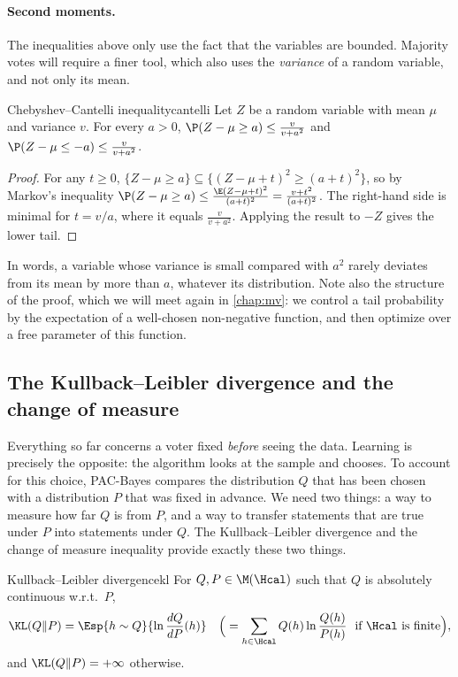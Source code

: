 \paragraph{Second moments.} The inequalities above only use the fact that the
variables are bounded. Majority votes will require a finer tool, which also
uses the \emph{variance} of a random variable, and not only its mean.

\begin{lemma}{Chebyshev--Cantelli inequality}{cantelli}
Let $Z$ be a random variable with mean $\mu$ and variance $v$. For every $a>0$,
$\P(Z-\mu\geq a)\leq\frac{v}{v+a^2}$ and $\P(Z-\mu\leq-a)\leq\frac{v}{v+a^2}$.
\end{lemma}
\begin{proof}
For any $t\geq0$, $\{Z-\mu\geq a\}\subseteq\{(Z-\mu+t)^2\geq(a+t)^2\}$, so by Markov's
inequality $\P(Z-\mu\geq a)\leq\frac{\E(Z-\mu+t)^2}{(a+t)^2}=\frac{v+t^2}{(a+t)^2}$. The
right-hand side is minimal for $t=v/a$, where it equals $\frac{v}{v+a^2}$. Applying
the result to $-Z$ gives the lower tail.
\end{proof}

In words, a variable whose variance is small compared with $a^2$ rarely
deviates from its mean by more than $a$, whatever its distribution. Note also
the structure of the proof, which we will meet again in \cref{chap:mv}: we control a tail probability by the expectation of a well-chosen non-negative
function, and then optimize over a free parameter of this function.

\subsection{The Kullback--Leibler divergence and the change of measure}

Everything so far concerns a voter fixed \emph{before} seeing the data. Learning
is precisely the opposite: the algorithm looks at the sample and chooses. To
account for this choice, PAC-Bayes compares the distribution $Q$ that has been
chosen with a distribution $P$ that was fixed in advance. We need two things: a
way to measure how far $Q$ is from $P$, and a way to transfer statements that are
true under $P$ into statements under $Q$. The Kullback--Leibler divergence and
the change of measure inequality provide exactly these two things.

\begin{definition}{Kullback--Leibler divergence}{kl}
For $Q,P\in\M(\Hcal)$ such that $Q$ is absolutely continuous w.r.t.\ $P$,
\[
  \KL(Q\|P)=\Esp{h\sim Q}{\ln\frac{dQ}{dP}(h)}
  \quad\Big(=\sum_{h\in\Hcal}Q(h)\ln\frac{Q(h)}{P(h)}\ \text{ if $\Hcal$ is finite}\Big),
\]
and $\KL(Q\|P)=+\infty$ otherwise.
\end{definition}

